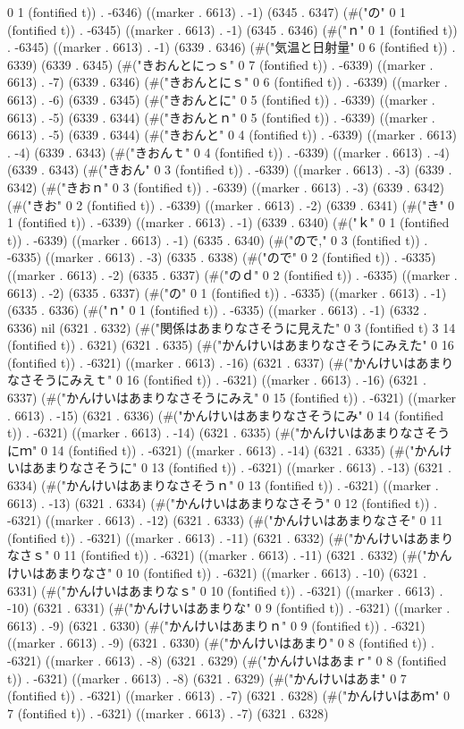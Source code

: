 0 1 (fontified t)) . -6346) ((marker . 6613) . -1) (6345 . 6347) (#("の" 0 1 (fontified t)) . -6345) ((marker . 6613) . -1) (6345 . 6346) (#("ｎ" 0 1 (fontified t)) . -6345) ((marker . 6613) . -1) (6339 . 6346) (#("気温と日射量" 0 6 (fontified t)) . 6339) (6339 . 6345) (#("きおんとにっｓ" 0 7 (fontified t)) . -6339) ((marker . 6613) . -7) (6339 . 6346) (#("きおんとにｓ" 0 6 (fontified t)) . -6339) ((marker . 6613) . -6) (6339 . 6345) (#("きおんとに" 0 5 (fontified t)) . -6339) ((marker . 6613) . -5) (6339 . 6344) (#("きおんとｎ" 0 5 (fontified t)) . -6339) ((marker . 6613) . -5) (6339 . 6344) (#("きおんと" 0 4 (fontified t)) . -6339) ((marker . 6613) . -4) (6339 . 6343) (#("きおんｔ" 0 4 (fontified t)) . -6339) ((marker . 6613) . -4) (6339 . 6343) (#("きおん" 0 3 (fontified t)) . -6339) ((marker . 6613) . -3) (6339 . 6342) (#("きおｎ" 0 3 (fontified t)) . -6339) ((marker . 6613) . -3) (6339 . 6342) (#("きお" 0 2 (fontified t)) . -6339) ((marker . 6613) . -2) (6339 . 6341) (#("き" 0 1 (fontified t)) . -6339) ((marker . 6613) . -1) (6339 . 6340) (#("ｋ" 0 1 (fontified t)) . -6339) ((marker . 6613) . -1) (6335 . 6340) (#("ので," 0 3 (fontified t)) . -6335) ((marker . 6613) . -3) (6335 . 6338) (#("ので" 0 2 (fontified t)) . -6335) ((marker . 6613) . -2) (6335 . 6337) (#("のｄ" 0 2 (fontified t)) . -6335) ((marker . 6613) . -2) (6335 . 6337) (#("の" 0 1 (fontified t)) . -6335) ((marker . 6613) . -1) (6335 . 6336) (#("ｎ" 0 1 (fontified t)) . -6335) ((marker . 6613) . -1) (6332 . 6336) nil (6321 . 6332) (#("関係はあまりなさそうに見えた" 0 3 (fontified t) 3 14 (fontified t)) . 6321) (6321 . 6335) (#("かんけいはあまりなさそうにみえた" 0 16 (fontified t)) . -6321) ((marker . 6613) . -16) (6321 . 6337) (#("かんけいはあまりなさそうにみえｔ" 0 16 (fontified t)) . -6321) ((marker . 6613) . -16) (6321 . 6337) (#("かんけいはあまりなさそうにみえ" 0 15 (fontified t)) . -6321) ((marker . 6613) . -15) (6321 . 6336) (#("かんけいはあまりなさそうにみ" 0 14 (fontified t)) . -6321) ((marker . 6613) . -14) (6321 . 6335) (#("かんけいはあまりなさそうにｍ" 0 14 (fontified t)) . -6321) ((marker . 6613) . -14) (6321 . 6335) (#("かんけいはあまりなさそうに" 0 13 (fontified t)) . -6321) ((marker . 6613) . -13) (6321 . 6334) (#("かんけいはあまりなさそうｎ" 0 13 (fontified t)) . -6321) ((marker . 6613) . -13) (6321 . 6334) (#("かんけいはあまりなさそう" 0 12 (fontified t)) . -6321) ((marker . 6613) . -12) (6321 . 6333) (#("かんけいはあまりなさそ" 0 11 (fontified t)) . -6321) ((marker . 6613) . -11) (6321 . 6332) (#("かんけいはあまりなさｓ" 0 11 (fontified t)) . -6321) ((marker . 6613) . -11) (6321 . 6332) (#("かんけいはあまりなさ" 0 10 (fontified t)) . -6321) ((marker . 6613) . -10) (6321 . 6331) (#("かんけいはあまりなｓ" 0 10 (fontified t)) . -6321) ((marker . 6613) . -10) (6321 . 6331) (#("かんけいはあまりな" 0 9 (fontified t)) . -6321) ((marker . 6613) . -9) (6321 . 6330) (#("かんけいはあまりｎ" 0 9 (fontified t)) . -6321) ((marker . 6613) . -9) (6321 . 6330) (#("かんけいはあまり" 0 8 (fontified t)) . -6321) ((marker . 6613) . -8) (6321 . 6329) (#("かんけいはあまｒ" 0 8 (fontified t)) . -6321) ((marker . 6613) . -8) (6321 . 6329) (#("かんけいはあま" 0 7 (fontified t)) . -6321) ((marker . 6613) . -7) (6321 . 6328) (#("かんけいはあｍ" 0 7 (fontified t)) . -6321) ((marker . 6613) . -7) (6321 . 6328) 